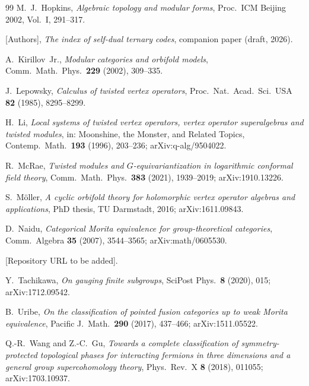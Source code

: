 \documentclass[11pt]{amsart}
\theoremstyle{definition}
\begin{document}
\begin{thebibliography}{99}
M.~J.~Hopkins, \emph{Algebraic topology and modular forms}, Proc.\ ICM Beijing 2002, Vol.~I, 291--317.

[Authors], \emph{The index of self-dual ternary codes}, companion paper (draft, 2026).

A.~Kirillov~Jr., \emph{Modular categories and orbifold models}, Comm.\ Math.\ Phys.\ \textbf{229} (2002),
309--335.

J.~Lepowsky, \emph{Calculus of twisted vertex operators}, Proc.\ Nat.\ Acad.\ Sci.\ USA \textbf{82}
(1985), 8295--8299.

H.~Li, \emph{Local systems of twisted vertex operators, vertex operator superalgebras and twisted
modules}, in: Moonshine, the Monster, and Related Topics, Contemp.\ Math.\ \textbf{193} (1996),
203--236; arXiv:q-alg/9504022.

R.~McRae, \emph{Twisted modules and $G$-equivariantization in logarithmic conformal field theory},
Comm.\ Math.\ Phys.\ \textbf{383} (2021), 1939--2019; arXiv:1910.13226.

S.~M\"oller, \emph{A cyclic orbifold theory for holomorphic vertex operator algebras and applications},
PhD thesis, TU Darmstadt, 2016; arXiv:1611.09843.

D.~Naidu, \emph{Categorical Morita equivalence for group-theoretical categories}, Comm.\ Algebra
\textbf{35} (2007), 3544--3565; arXiv:math/0605530.

[Repository URL to be added].

Y.~Tachikawa, \emph{On gauging finite subgroups}, SciPost Phys.\ \textbf{8} (2020), 015;
arXiv:1712.09542.

B.~Uribe, \emph{On the classification of pointed fusion categories up to weak Morita equivalence},
Pacific J.\ Math.\ \textbf{290} (2017), 437--466; arXiv:1511.05522.

Q.-R.~Wang and Z.-C.~Gu, \emph{Towards a complete classification of symmetry-protected topological
phases for interacting fermions in three dimensions and a general group supercohomology theory}, Phys.\
Rev.\ X \textbf{8} (2018), 011055; arXiv:1703.10937.

\end{thebibliography}
\end{document}
